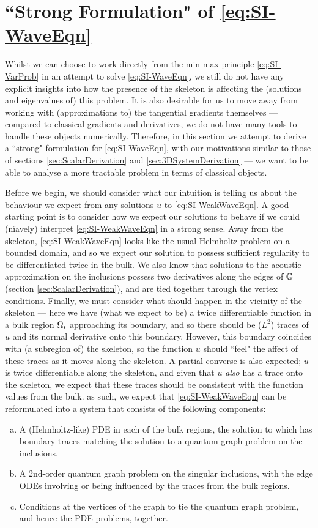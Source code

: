 \section{``Strong Formulation" of \eqref{eq:SI-WaveEqn}} \label{sec:SI-StrongDerivation}
Whilst we can choose to work directly from the min-max principle \eqref{eq:SI-VarProb} in an attempt to solve \eqref{eq:SI-WaveEqn}, we still do not have any explicit insights into how the presence of the skeleton is affecting the (solutions and eigenvalues of) this problem.
It is also desirable for us to move away from working with (approximations to) the tangential gradients themselves --- compared to classical gradients and derivatives, we do not have many tools to handle these objects numerically.
Therefore, in this section we attempt to derive a ``strong" formulation for \eqref{eq:SI-WaveEqn}, with our motivations similar to those of sections \ref{sec:ScalarDerivation} and \ref{sec:3DSystemDerivation} --- we want to be able to analyse a more tractable problem in terms of classical objects.

Before we begin, we should consider what our intuition is telling us about the behaviour we expect from any solutions $u$ to \eqref{eq:SI-WeakWaveEqn}.
A good starting point is to consider how we expect our solutions to behave if we could (n\"{i}avely) interpret \eqref{eq:SI-WeakWaveEqn} in a strong sense.
Away from the skeleton, \eqref{eq:SI-WeakWaveEqn} looks like the usual Helmholtz problem on a bounded domain, and so we expect our solution to possess sufficient regularity to be differentiated twice in the bulk.
We also know that solutions to the acoustic approximation on the inclusions possess two derivatives along the edges of $\mathbb{G}$ (section \ref{sec:ScalarDerivation}), and are tied together through the vertex conditions.
Finally, we must consider what should happen in the vicinity of the skeleton --- here we have (what we expect to be) a twice differentiable function in a bulk region $\Omega_i$ approaching its boundary, and so there should be ($L^2$) traces of $u$ and its normal derivative onto this boundary.
However, this boundary coincides with (a subregion of) the skeleton, so the function $u$ should ``feel" the affect of these traces as it moves along the skeleton.
A partial converse is also expected; $u$ is twice differentiable along the skeleton, and given that $u$ \emph{also} has a trace onto the skeleton, we expect that these traces should be consistent with the function values from the bulk.
as such, we expect that \eqref{eq:SI-WeakWaveEqn} can be reformulated into a system that consists of the following components:
\begin{enumerate}[(a)]
	\item A (Helmholtz-like) PDE in each of the bulk regions, the solution to which has boundary traces matching the solution to a quantum graph problem on the inclusions.
	\item A 2nd-order quantum graph problem on the singular inclusions, with the edge ODEs involving or being influenced by the traces from the bulk regions.
	\item Conditions at the vertices of the graph to tie the quantum graph problem, and hence the PDE problems, together.
\end{enumerate}

